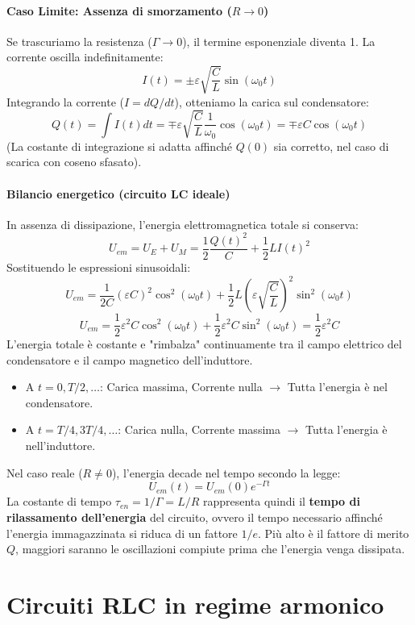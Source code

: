 \documentclass{book}
\begin{document}
\paragraph{Caso Limite: Assenza di smorzamento ($R \to 0$)}
Se trascuriamo la resistenza ($\Gamma \to 0$), il termine esponenziale diventa 1. La corrente oscilla indefinitamente:
$$
I(t) = \pm \varepsilon \sqrt{\frac{C}{L}} \sin(\omega_0 t)
$$
Integrando la corrente ($I = dQ/dt$), otteniamo la carica sul condensatore:
$$
Q(t) = \int I(t) dt = \mp \varepsilon \sqrt{\frac{C}{L}} \frac{1}{\omega_0} \cos(\omega_0 t) = \mp \varepsilon C \cos(\omega_0 t)
$$
(La costante di integrazione si adatta affinché $Q(0)$ sia corretto, nel caso di scarica con coseno sfasato).

\paragraph{Bilancio energetico (circuito LC ideale)}
In assenza di dissipazione, l'energia elettromagnetica totale si conserva:
$$
U_{em} = U_E + U_M = \frac{1}{2}\frac{Q(t)^2}{C} + \frac{1}{2}L I(t)^2
$$
Sostituendo le espressioni sinusoidali:
$$
U_{em} = \frac{1}{2C} (\varepsilon C)^2 \cos^2(\omega_0 t) + \frac{1}{2}L \left(\varepsilon \sqrt{\frac{C}{L}}\right)^2 \sin^2(\omega_0 t)
$$
$$
U_{em} = \frac{1}{2} \varepsilon^2 C \cos^2(\omega_0 t) + \frac{1}{2} \varepsilon^2 C \sin^2(\omega_0 t) = \frac{1}{2} \varepsilon^2 C
$$
L'energia totale è costante e "rimbalza" continuamente tra il campo elettrico del condensatore e il campo magnetico dell'induttore.
\begin{itemize}
    \item A $t=0, T/2, \dots$: Carica massima, Corrente nulla $\to$ Tutta l'energia è nel condensatore.
    \item A $t=T/4, 3T/4, \dots$: Carica nulla, Corrente massima $\to$ Tutta l'energia è nell'induttore.
\end{itemize}

Nel caso reale ($R \neq 0$), l'energia decade nel tempo secondo la legge:
$$
U_{em}(t) = U_{em}(0) e^{-\Gamma t}
$$
La costante di tempo $\tau_{en} = 1/\Gamma = L/R$ rappresenta quindi il \textbf{tempo di rilassamento dell'energia} del circuito, ovvero il tempo necessario affinché l'energia immagazzinata si riduca di un fattore $1/e$. Più alto è il fattore di merito $Q$, maggiori saranno le oscillazioni compiute prima che l'energia venga dissipata.


\section{Circuiti RLC in regime armonico}
\end{document}

